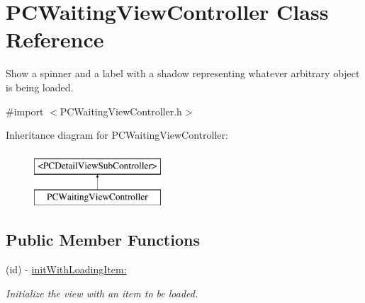 \hypertarget{interface_p_c_waiting_view_controller}{
\section{PCWaitingViewController Class Reference}
\label{interface_p_c_waiting_view_controller}
}


Show a spinner and a label with a shadow representing whatever arbitrary object is being loaded.  




{\ttfamily \#import $<$PCWaitingViewController.h$>$}

Inheritance diagram for PCWaitingViewController:\begin{figure}[h!]
\begin{center}
\leavevmode
\includegraphics[height=2.000000cm]{kegg_doc/interface_p_c_waiting_view_controller}
\end{center}
\end{figure}
\subsection*{Public Member Functions}
\begin{DoxyCompactItemize}
\item 
\hypertarget{interface_p_c_waiting_view_controller_adb8f199cd846d515269a170d2b2d64ff}{
(id) -\/ \hyperlink{interface_p_c_waiting_view_controller_adb8f199cd846d515269a170d2b2d64ff}{initWithLoadingItem:}}
\label{interface_p_c_waiting_view_controller_adb8f199cd846d515269a170d2b2d64ff}

\begin{DoxyCompactList}\small\item\em Initialize the view with an item to be loaded. \end{DoxyCompactList}\end{DoxyCompactItemize}
